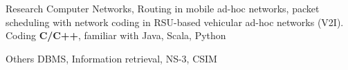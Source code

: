 
\begin{cvskills}

  \cvskill
    {Research} %
    {Computer Networks, Routing in mobile ad-hoc networks, packet scheduling with network coding in RSU-based vehicular ad-hoc networks (V2I).} %
  \cvskill
    {Coding} %
    {\textbf{C/C++}, familiar with Java, Scala, Python} %


 \cvskill
   {Others} %
   {DBMS, Information retrieval, NS-3, CSIM} %

\end{cvskills}
